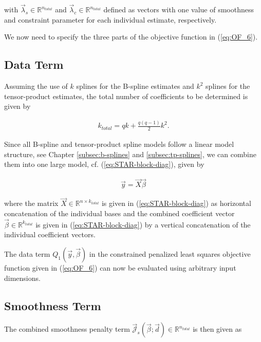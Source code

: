 \documentclass[10pt,a4paper]{report}
\begin{document}
with $\vec{\lambda}_s \in \mathbb{R}^{n_{total}}$ and  $\vec{\lambda}_c \in \mathbb{R}^{n_{total}}$  defined as vectors with one value of smoothness and constraint parameter for each individual estimate, respectively. 

We now need to specify the three parts of the objective function in (\ref{eq:OF_6}). 

\subsection{Data Term}

Assuming the use of $k$ splines for the B-spline estimates and $k^2$ splines for the tensor-product estimates, the total number of coefficients to be determined is given by 

\begin{align}\label{eq:tps_total_number_of_coef}
	k_{total} = qk + \frac{q(q-1)}{2}k^2. 
\end{align}

Since all B-spline and tensor-product spline models follow a linear model structure, see Chapter \ref{subsec:b-splines} and \ref{subsec:tp-splines}, we can combine them into one large model, cf. (\ref{eq:STAR-block-diag}), given by

\begin{align}\label{eq:tps_lin_mod}
	\vec{y} = \vec{X} \vec{\beta}
\end{align}

where the matrix $\vec{X} \in \mathbb{R}^{n \times k_{total}}$ is given in (\ref{eq:STAR-block-diag}) as horizontal concatenation of the individual bases and the combined coefficient vector $\vec{\beta} \in \mathbb{R}^{k_{total}}$ is given in (\ref{eq:STAR-block-diag}) by a vertical concatenation of the individual coefficient vectors. 

The data term $Q_1(\vec{y}, \vec{\beta})$ in the constrained penalized least squares objective function given in (\ref{eq:OF_6}) can now be evaluated using arbitrary input dimensions. 

\subsection{Smoothness Term}

The combined smoothness penalty term $\vec{\mathcal{J}}_s(\vec{\beta}; \vec{d}) \in \mathbb{R}^{n_{total}}$ is then given as
\end{document}
